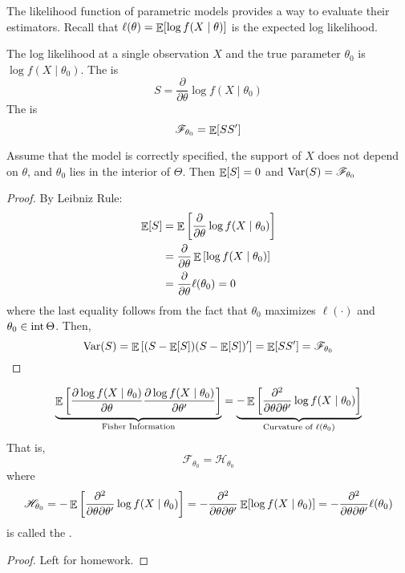 \documentclass[10pt]{article}
\begin{document}
\begin{remark}
	The likelihood function of parametric models provides a way to evaluate their estimators. Recall that $\ell(\theta) = \mathop{\mathbb{E}}[\log f(X \mid \theta)]$ is the expected log likelihood.
\end{remark}

\begin{definition}
	The log likelihood at a single observation $X$ and the true parameter $\theta_0$ is $\log f(X\mid \theta_0)$. The  is
	\[
	S = \frac{\partial}{\partial \theta} \log f(X\mid \theta_0)
	\]
	The  is
	\[
	\mathscr{F}_{\theta_0} = \mathop{\mathbb{E}}[SS']
	\]
\end{definition}

\begin{theorem}
	Assume that the model is correctly specified, the support of $X$ does not depend on $\theta$, and $\theta_0$ lies in the interior of $\Theta$. Then $\mathop{\mathbb{E}}[S] = 0$ and $\mathop{\rm Var}(S) = \mathscr{F}_{\theta_0}$
\end{theorem}
\begin{proof}
	By Leibniz Rule:
	\begin{align*}
		\mathop{\mathbb{E}}[S] &= \mathop{\mathbb{E}}\left[ \frac{\partial}{\partial \theta} \log f(X\mid \theta_0)\right] \\
		&= \frac{\partial}{\partial \theta} \mathop{\mathbb{E}} \left[ \log f(X \mid \theta_0)\right] \\
		&= \frac{\partial}{\partial \theta} \ell(\theta_0) = 0
	\end{align*}
	where the last equality follows from the fact that $\theta_0$ maximizes $\ell(\cdot)$ and $\theta_0 \in \mathop{\rm int} \Theta$. Then,
	\[
	\mathop{\rm Var}(S) = \mathop{\mathbb{E}}\left[ (S - \mathop{\mathbb{E}}[S])(S - \mathop{\mathbb{E}}[S])'\right]= \mathop{\mathbb{E}}[SS'] = \mathscr{F}_{\theta_0}
	\]
\end{proof}

\begin{theorem}
	\[
	\underbrace{\mathop{\mathbb{E}} \left[ \frac{\partial \log f(X \mid \theta_0)}{\partial \theta} \frac{\partial \log f(X \mid \theta_0)}{\partial \theta'}\right]}_{\textnormal{Fisher Information}} = \underbrace{-\mathop{\mathbb{E}} \left[ \frac{\partial^2}{\partial\theta\partial\theta'} \log f(X \mid \theta_0)\right]}_{\textnormal{Curvature of } \ell(\theta_0)}
	\]
	That is,
	\[
	\mathscr{F}_{\theta_0} = \mathscr{H}_{\theta_0}
	\]
	where
	\[
	\mathscr{H}_{\theta_0} = -\mathop{\mathbb{E}} \left[ \frac{\partial^2}{\partial\theta\partial\theta'} \log f(X \mid \theta_0)\right] = -\frac{\partial^2}{\partial\theta\partial\theta'} \mathop{\mathbb{E}}[\log f(X \mid \theta_0)] = -\frac{\partial^2}{\partial\theta\partial\theta'} \ell(\theta_0)
	\]
	is called the .
\end{theorem}
\begin{proof}
	Left for homework.
\end{proof}
\end{document}
